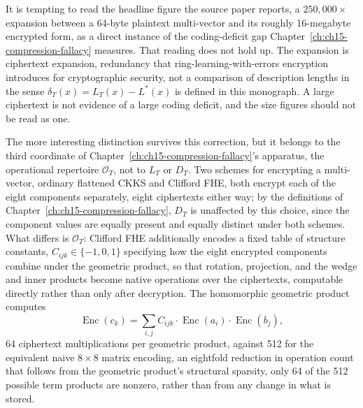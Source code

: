 It is tempting to read the headline figure the source paper reports, a $250{,}000\times$ expansion between a 64-byte plaintext multi-vector and its roughly 16-megabyte encrypted form, as a direct instance of the coding-deficit gap Chapter~\ref{ch:ch15-compression-fallacy} measures. That reading does not hold up. The expansion is ciphertext expansion, redundancy that ring-learning-with-errors encryption introduces for cryptographic security, not a comparison of description lengths in the sense $\delta_T(x) = L_T(x) - L^\ast(x)$ is defined in this monograph. A large ciphertext is not evidence of a large coding deficit, and the size figures should not be read as one.

The more interesting distinction survives this correction, but it belongs to the third coordinate of Chapter~\ref{ch:ch15-compression-fallacy}'s apparatus, the operational repertoire $\mathcal{O}_T$, not to $L_T$ or $D_T$. Two schemes for encrypting a multi-vector, ordinary flattened CKKS and Clifford FHE, both encrypt each of the eight components separately, eight ciphertexts either way; by the definitions of Chapter~\ref{ch:ch15-compression-fallacy}, $D_T$ is unaffected by this choice, since the component values are equally present and equally distinct under both schemes. What differs is $\mathcal{O}_T$: Clifford FHE additionally encodes a fixed table of structure constants, $C_{ijk} \in \{-1,0,1\}$ specifying how the eight encrypted components combine under the geometric product, so that rotation, projection, and the wedge and inner products become native operations over the ciphertexts, computable directly rather than only after decryption. The homomorphic geometric product computes
\[
\operatorname{Enc}(c_k) = \sum_{i,j} C_{ijk} \cdot \operatorname{Enc}(a_i) \cdot \operatorname{Enc}(b_j),
\]
64 ciphertext multiplications per geometric product, against 512 for the equivalent naive $8\times 8$ matrix encoding, an eightfold reduction in operation count that follows from the geometric product's structural sparsity, only 64 of the 512 possible term products are nonzero, rather than from any change in what is stored.


